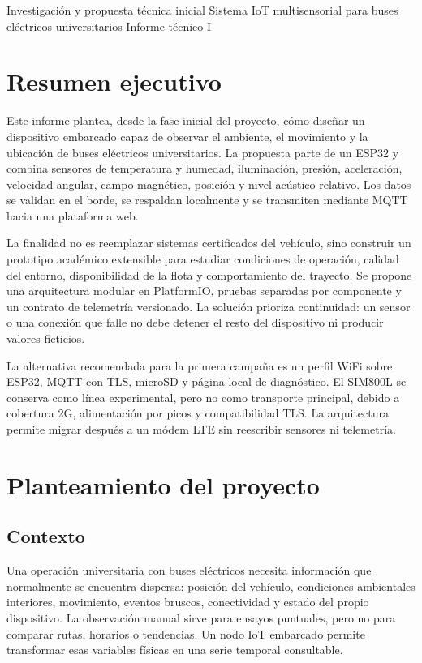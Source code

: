 \documentclass[11pt,a4paper,oneside]{report}
\begin{document}
\VScover
  {Investigación y propuesta técnica inicial}
  {Sistema IoT multisensorial para buses eléctricos universitarios}
  {Informe técnico I}

\chapter*{Resumen ejecutivo}
Este informe plantea, desde la fase inicial del proyecto, cómo diseñar un dispositivo
embarcado capaz de observar el ambiente, el movimiento y la ubicación de buses
eléctricos universitarios. La propuesta parte de un ESP32 y combina sensores de
temperatura y humedad, iluminación, presión, aceleración, velocidad angular, campo
magnético, posición y nivel acústico relativo. Los datos se validan en el borde,
se respaldan localmente y se transmiten mediante MQTT hacia una plataforma web.

La finalidad no es reemplazar sistemas certificados del vehículo, sino construir un
prototipo académico extensible para estudiar condiciones de operación, calidad del
entorno, disponibilidad de la flota y comportamiento del trayecto. Se propone una
arquitectura modular en PlatformIO, pruebas separadas por componente y un contrato de
telemetría versionado. La solución prioriza continuidad: un sensor o una conexión que
falle no debe detener el resto del dispositivo ni producir valores ficticios.

\begin{vsidea}[title={Resultado de la investigación}]
La alternativa recomendada para la primera campaña es un perfil WiFi sobre ESP32,
MQTT con TLS, microSD y página local de diagnóstico. El SIM800L se conserva como
línea experimental, pero no como transporte principal, debido a cobertura 2G,
alimentación por picos y compatibilidad TLS. La arquitectura permite migrar después a
un módem LTE sin reescribir sensores ni telemetría.
\end{vsidea}

\tableofcontents
\listoffigures
\clearpage
{}

\chapter{Planteamiento del proyecto}

\section{Contexto}
Una operación universitaria con buses eléctricos necesita información que normalmente
se encuentra dispersa: posición del vehículo, condiciones ambientales interiores,
movimiento, eventos bruscos, conectividad y estado del propio dispositivo. La
observación manual sirve para ensayos puntuales, pero no para comparar rutas, horarios
o tendencias. Un nodo IoT embarcado permite transformar esas variables físicas en una
serie temporal consultable.
\end{document}

